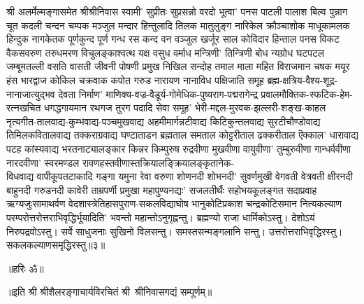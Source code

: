 \begin{flushleft}
श्री अलर्मेल्मङ्गासमेत श्रीश्रीनिवास स्वामी' सुप्रीतः सुप्रसन्नो वरदो
भूत्वा' पनस पाटली पालाश बिल्व पुन्नाग चूत कदली चन्दन
चम्पक मञ्जुल मन्दार हिन्तुलादि तिलक मातुलुङ्ग नारिकेल
क्रौञ्चाशोक माधूकामलक हिन्दुक नागकेतक पूर्णकुन्द पूर्ण गन्ध रस
कन्द वन वञ्जुल खर्जूर साल कोविदार हिन्ताल पनस विकट
वैकसवरुण तरुधमरण विचुलङ्काश्वत्थ यक्ष वसुध वर्माध मन्त्रिणी'
तिन्त्रिणी बोध न्यग्रोध घटपटल जम्बूमतल्ली वसति वासती जीवनी
पोषणी प्रमुख निखिल सन्दोह तमाल माला महित विराजमान चषक
मयूर हंस भारद्वाज कोकिल चक्रवाक कपोत गरुड नारायण नानाविध पक्षिजाति समूह ब्रह्म-क्षत्रिय-वैश्य-शूद्र-नानाजात्युद्भव देवता
निर्माण' माणिक्य-वज्र-वैडूर्य-गोमेधिक-पुष्यराग-पद्मरागेन्द्र प्रवालमौक्तिक-स्फटिक-हेम-रत्नखचित धगद्धगायमान रथगज
तुरग पदादि सेवा समूह' भेरी-मद्दल-मुरवक-झल्लरी-शङ्ख-काहल नृत्यगीत-तालवाद्य-कुम्भवाद्य-पञ्चमुखवाद्य अहमीमार्गन्नटीवाद्य किटिकुन्तलवाद्य सुरटीचौण्डोवाद्य तिमिलकवितालवाद्य
तक्कराग्रवाद्य घण्टाताडन ब्रह्मताल समताल कोट्टरीताल ढक्करीताल ऎक्काल' धारावाद्य पटह कांस्यवाद्य भरतनाट्यालङ्कार किन्नर किम्पुरुष
रुद्रवीणा मुखवीणा वायुवीणा' तुम्बुरुवीणा गान्धर्ववीणा नारदवीणा' स्वरमण्डल रावणहस्तवीणास्तक्रियालङ्क्रियालङ्कृतानेक-\\विधवाद्य वापीकूपतटाकादि गङ्गा यमुना रेवा वरुणा शोणनदी शोभनदी'
सुवर्णमुखी वेगवती वेत्रवती क्षीरनदी बाहुनदी गरुडनदी कावेरी ताम्रपर्णी प्रमुखा महापुण्यनद्यः' सजलतीर्थैः सहोभयकूलङ्गत सदाप्रवाह ऋग्यजुःसामाथर्वण वेदशास्त्रेतिहासपुराण-सकलविद्याघोष भानुकोटिप्रकाश चन्द्रकोटिसमान नित्यकल्याण परम्परोत्तरोत्तराभिवृद्धिर्भूयादिति' भवन्तो महान्तोऽनुगृह्णन्तु। 
ब्रह्मण्यो राजा धार्मिकोऽस्तु। देशोऽयं निरुपद्रवोऽस्तु।
सर्वे साधुजनाः सुखिनो विलसन्तु। समस्तसन्मङ्गलानि सन्तु। उत्तरोत्तराभिवृद्धिरस्तु। सकलकल्याणसमृद्धिरस्तु॥३॥
\centerline{॥हरिः ॐ॥}
\centerline{॥इति श्री श्रीशैलरङ्गाचार्यविरचितं श्री~श्रीनिवासगद्यं सम्पूर्णम्॥}
\end{flushleft}